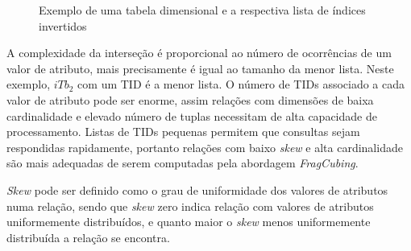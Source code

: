 \begin{figure}[!htb]
	\caption{Exemplo de uma tabela dimensional e a respectiva lista de índices invertidos}\label{fig:fragexample}
	\vspace{2mm}
	\begin{center}
	\end{center}
	\vspace{1mm}
	\legenda{}
\end{figure}

A complexidade da interseção é proporcional ao número de ocorrências de um valor de atributo, mais precisamente é igual ao tamanho da menor lista.
Neste exemplo, $iTb_2$ com um TID é a menor lista.
O número de TIDs associado a cada valor de atributo pode ser enorme, assim relações com dimensões de baixa cardinalidade e elevado número de tuplas necessitam de alta capacidade de processamento.
Listas de TIDs pequenas permitem que consultas sejam respondidas rapidamente, portanto relações com baixo \textit{skew} e alta cardinalidade são mais adequadas de serem computadas pela abordagem \textit{FragCubing}.

\textit{Skew} pode ser definido como o grau de uniformidade dos valores de atributos numa relação, sendo que \textit{skew} zero indica relação com valores de atributos uniformemente distribuídos, e quanto maior o \textit{skew} menos uniformemente distribuída a relação se encontra.

